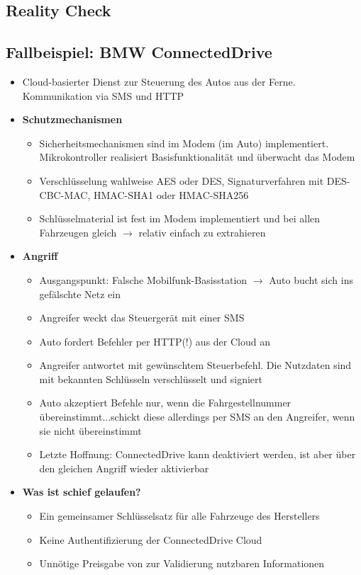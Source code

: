 \subsection{Reality Check}

\subsection{Fallbeispiel: BMW ConnectedDrive}
\begin{itemize}
	\item Cloud-basierter Dienst zur Steuerung des Autos aus der Ferne. Kommunikation via SMS und HTTP
	\item \textbf{Schutzmechanismen}
	\begin{itemize}
		\item Sicherheitsmechanismen sind im Modem (im Auto) implementiert. Mikrokontroller realisiert Basisfunktionalität und überwacht das Modem
		\item Verschlüsselung wahlweise AES oder DES, Signaturverfahren mit DES-CBC-MAC, HMAC-SHA1 oder HMAC-SHA256
		\item Schlüsselmaterial ist fest im Modem implementiert und bei allen Fahrzeugen gleich \(\rightarrow\) relativ einfach zu extrahieren
	\end{itemize}
	\item \textbf{Angriff}
	\begin{itemize}
		\item Ausgangspunkt: Falsche Mobilfunk-Basisstation \(\rightarrow\) Auto bucht sich ins gefälschte Netz ein
		\item Angreifer weckt das Steuergerät mit einer SMS
		\item Auto fordert Befehler per HTTP(!) aus der Cloud an
		\item Angreifer antwortet mit gewünschtem Steuerbefehl. Die Nutzdaten sind mit bekannten Schlüsseln verschlüsselt und signiert
		\item Auto akzeptiert Befehle nur, wenn die Fahrgestellnummer übereinstimmt...schickt diese allerdings per SMS an den Angreifer, wenn sie nicht übereinstimmt
		\item Letzte Hoffnung: ConnectedDrive kann deaktiviert werden, ist aber über den gleichen Angriff wieder aktivierbar
	\end{itemize}
	\item \textbf{Was ist schief gelaufen?}
	\begin{itemize}
		\item Ein gemeinsamer Schlüsselsatz für alle Fahrzeuge des Herstellers
		\item Keine Authentifizierung der ConnectedDrive Cloud
		\item Unnötige Preisgabe von zur Validierung nutzbaren Informationen
	\end{itemize}
\end{itemize}

